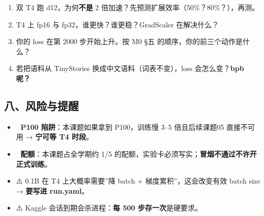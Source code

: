 \documentclass[
  chinese,
  11pt,
]{ctexart}
\providecommand{\tightlist}{%
  \setlength{\itemsep}{0pt}\setlength{\parskip}{0pt}}
\begin{document}
\begin{enumerate}
\def\labelenumi{\arabic{enumi}.}
\tightlist
\item
  双 T4 跑 d12，为何\textbf{不是} 2 倍加速？先预测扩展效率（50\%？80\%？），再测。
\item
  T4 上 fp16 与 fp32，谁更快？谁更稳？GradScaler 在解决什么？
\item
  你的 loss 在第 2000 步开始上升。按 M0 §五 的顺序，你的前三个动作是什么？
\item
  若把语料从 TinyStories 换成中文语料（词表不变），loss 会怎么变？\textbf{bpb 呢？}
\end{enumerate}

\subsection{八、风险与提醒}\label{ux516bux98ceux9669ux4e0eux63d0ux9192}

\begin{itemize}
\tightlist
\item
  🚨 \textbf{P100 陷阱}：本课题如果拿到 P100，训练慢 3--5 倍且后续课题05 直接不可用 → \textbf{宁可等 T4 时段}。
\item
  🚨 \textbf{配额}：本课题占全学期约 1/5 的配额，实验卡必须写实；\textbf{冒烟不通过不许开正式训练}。
\item
  ⚠️ 0.1B 在 T4 上大概率需要''降 batch + 梯度累积''，这会改变有效 batch size → \textbf{要写进 run.yaml}。
\item
  ⚠️ Kaggle 会话到期会杀进程：\textbf{每 500 步存一次}是硬要求。
\end{itemize}
\end{document}
